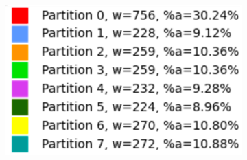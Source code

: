 \begin{figure}[h]
\centering
\begin{subfigure}{.33\textwidth}
    \centering
    \caption[short]{}
\end{subfigure}%
\begin{subfigure}{.33\textwidth}
    \centering
    \caption[short]{}
\end{subfigure}%
\begin{subfigure}{.33\textwidth}
    \centering
    \includegraphics[width=0.9\linewidth]{images/results/m_k/with/5/results}

\end{subfigure}
\end{figure}

